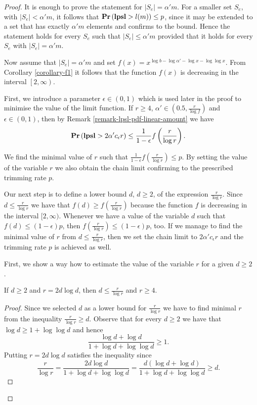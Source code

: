 \begin{proof}
It is enough to prove the statement for $|S_e| = \alpha' m$. For a smaller set $S_e$, with $|S_e| < \alpha' m$, it follows that $\mathbf{Pr}\left(\mathbf{lpsl} > l(m)\right) \leq p$, since it may be extended to a set that has exactly $\alpha'm$ elements and confirms to the bound. Hence the statement holds for every $S_e$ such that $|S_e| \leq \alpha'm$ provided that it holds for every $S_e$ with $|S_e| = \alpha' m$.

Now assume that $|S_e| = \alpha' m$ and set $f(x) = x ^ {\log b - \log \alpha' - \log x - \log \log x}$. From Corollary \ref{corollary-f1} it follows that the function $f(x)$ is decreasing in the interval $\left[2, \infty \right)$.

First, we introduce a parameter $\epsilon \in (0, 1)$ which is used later in the proof to minimise the value of the limit function. If $r \geq 4$, $\alpha' \in \left(0.5, \frac{r}{\log f}\right)$ and $\epsilon \in (0, 1)$, then by Remark \ref{remark-lpsl-pdf-linear-amount} we have
\[
	\mathbf{Pr}\left(\mathbf{lpsl} > 2 \alpha' c_\epsilon r\right) \leq \frac{1}{1 - \epsilon} f\left(\frac{r}{\log r}\right) \text{.}
\]

We find the minimal value of $r$ such that $\frac{1}{1 - \epsilon} f\left(\frac{r}{\log r}\right) \leq p$. By setting the value of the variable $r$ we also obtain the chain limit confirming to the prescribed trimming rate $p$. 

Our next step is to define a lower bound $d$, $d \geq 2$, of the expression $\frac{r}{\log r}$. Since $d \leq \frac{r}{\log r}$ we have that $f(d) \geq f\left(\frac{r}{\log r}\right)$ because the function $f$ is decreasing in the interval $[2, \infty)$. Whenever we have a value of the variable $d$ such that $f(d) \leq (1 - \epsilon) p$, then $f\left(\frac{r}{\log r}\right) \leq (1 - \epsilon) p$, too. If we manage to find the minimal value of $r$ from $d \leq \frac{r}{\log r}$, then we set the chain limit to $2 \alpha' c_\epsilon r$ and the trimming rate $p$ is achieved as well. 

First, we show a way how to estimate the value of the variable $r$ for a given $d \geq 2$. 
\begin{claim}
\label{claim-choose-r}
If $d \geq 2$ and $r = 2d \log d$, then $d \leq \frac{r}{\log r}$ and $r \geq 4$.
\end{claim}
\begin{proof}
Since we selected $d$ as a lower bound for $\frac{r}{\log r}$ we have to find minimal $r$ from the inequality $\frac{r}{\log r} \geq d$. Observe that for every $d \geq 2$ we have that $\log d \geq 1 + \log \log d$ and hence \[\frac{\log d + \log d}{1 + \log d + \log \log d} \geq 1 \text{.}\] Putting $r = 2 d \log d$ satisfies the inequality since
\[
\frac{r}{\log r} = \frac{2 d \log d}{1 + \log d + \log \log d} = \frac{d(\log d + \log d)}{1 + \log d + \log \log d} \geq d \text{.}
\]


\end{proof}
\end{proof}
